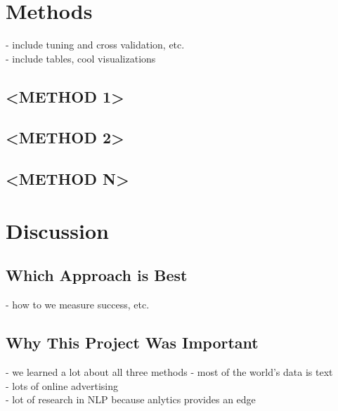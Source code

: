 \documentclass[11pt]{article}
\begin{document}


\section{Methods}
- include tuning and cross validation, etc. \\
- include tables, cool visualizations \\

\subsection{<METHOD 1>}

\subsection{<METHOD 2>}

\subsection{<METHOD N>}



\section{Discussion}
\subsection{Which Approach is Best}
- how to we measure success, etc.

\subsection{Why This Project Was Important}
- we learned a lot about all three methods
- most of the world's data is text \\
- lots of online advertising \\
- lot of research in NLP because anlytics provides an edge \\
\end{document}

